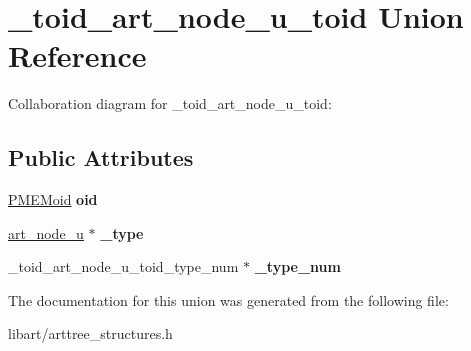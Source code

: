 \hypertarget{union__toid__art__node__u__toid}{}\section{\+\_\+toid\+\_\+art\+\_\+node\+\_\+u\+\_\+toid Union Reference}
\label{union__toid__art__node__u__toid}


Collaboration diagram for \+\_\+toid\+\_\+art\+\_\+node\+\_\+u\+\_\+toid\+:
\subsection*{Public Attributes}
\begin{DoxyCompactItemize}
\item 
\mbox{\label{union__toid__art__node__u__toid_a323252c64266a12bf8264142c516e2e6}} 
\hyperlink{structpmemoid}{P\+M\+E\+Moid} {\bfseries oid}
\item 
\mbox{\label{union__toid__art__node__u__toid_a805554574c1ec52470c33064aba288de}} 
\hyperlink{struct__art__node__u}{art\+\_\+node\+\_\+u} $\ast$ {\bfseries \+\_\+type}
\item 
\mbox{\label{union__toid__art__node__u__toid_ae443c287aef941d81ea066bf8f0db413}} 
\+\_\+toid\+\_\+art\+\_\+node\+\_\+u\+\_\+toid\+\_\+type\+\_\+num $\ast$ {\bfseries \+\_\+type\+\_\+num}
\end{DoxyCompactItemize}


The documentation for this union was generated from the following file\+:\begin{DoxyCompactItemize}
\item 
libart/arttree\+\_\+structures.\+h\end{DoxyCompactItemize}
